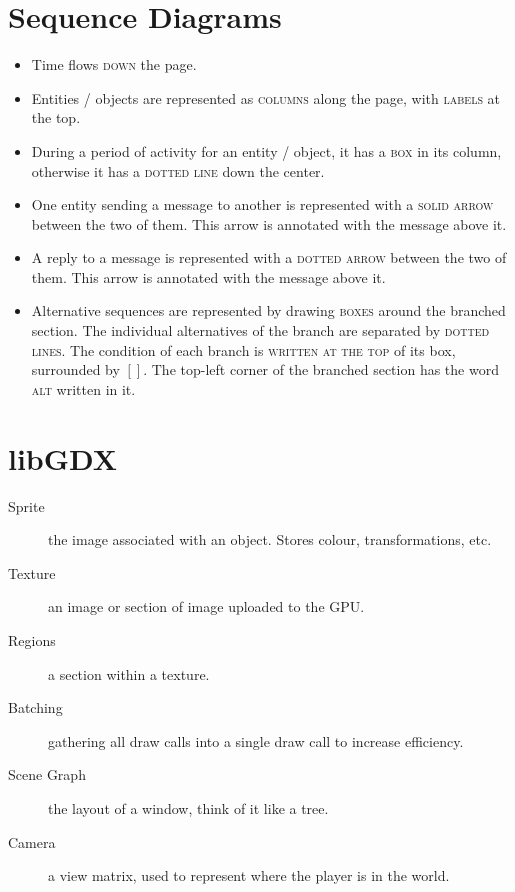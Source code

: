 \documentclass[landscape]{cheat}
\begin{document}
\begin{multicols*}{3}
\section{Sequence Diagrams}
\begin{itemize}
    \item Time flows \textsc{down} the page.
    \item Entities / objects are represented as \textsc{columns} along the page, with \textsc{labels} at the top.
    \item During a period of activity for an entity / object, it has a \textsc{box} in its column, otherwise it has a \textsc{dotted line} down the center.
    \item One entity sending a message to another is represented with a \textsc{solid arrow} between the two of them.
        This arrow is annotated with the message above it.
    \item A reply to a message is represented with a \textsc{dotted arrow} between the two of them.
        This arrow is annotated with the message above it.
    \item Alternative sequences are represented by drawing \textsc{boxes} around the branched section.
        The individual alternatives of the branch are separated by \textsc{dotted lines}.
        The condition of each branch is \textsc{written at the top} of its box, surrounded by $[]$.
        The top-left corner of the branched section has the word \textsc{alt} written in it.
\end{itemize}

\section{libGDX}
\begin{description}
    \item[Sprite] the image associated with an object.
        Stores colour, transformations, etc.
    \item[Texture] an image or section of image uploaded to the GPU.
    \item[Regions] a section within a texture.
    \item[Batching] gathering all draw calls into a single draw call to increase efficiency.
    \item[Scene Graph] the layout of a window, think of it like a tree.
    \item[Camera] a view matrix, used to represent where the player is in the world.
\end{description}

\end{multicols*}
\end{document}

